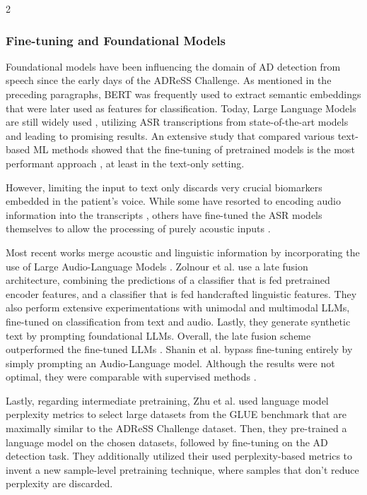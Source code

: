 \documentclass[10pt]{article}
\begin{document}
\begin{multicols}{2}
\subsubsection{Fine-tuning and Foundational Models} \par Foundational models
have been influencing the domain of AD detection from speech since the early
days of the ADReSS Challenge. As mentioned in the preceding paragraphs, BERT
was frequently used to extract semantic embeddings that were later used as
features for classification. Today, Large Language Models are still widely used
\cite{keOptimizingPauseContext2025,parkReasoningBasedApproachChainofThought,rundeOptimizationNaturalLanguage2024},
utilizing ASR transcriptions from state-of-the-art models and leading to
promising results. An extensive study that compared various text-based ML
methods showed that the fine-tuning of pretrained models is the most performant
approach \cite{ihnainiDetectionAlzheimersDisease2025}, at least in the
text-only setting. \par However, limiting the input to text only discards very
crucial biomarkers embedded in the patient's voice. While some have resorted to
encoding audio information into the transcripts
\cite{keOptimizingPauseContext2025}, others have fine-tuned the ASR models
themselves to allow the processing of purely acoustic inputs
\cite{jiaWhisperBasedMultilingualAlzheimers,
akinrintoyoWhisperDDementiaSpeech2025, liWhisperBasedTransferLearning2024}.
\par Most recent works merge acoustic and linguistic information by
incorporating the use of Large Audio-Language Models
\cite{zolnourLLMCAREEarlyDetection2025, shahinZeroShotCognitiveImpairment2025}.
Zolnour et al. use a late fusion architecture, combining the predictions of a
classifier that is fed pretrained encoder features, and a classifier that is
fed handcrafted linguistic features. They also perform extensive
experimentations with unimodal and multimodal LLMs, fine-tuned on
classification from text and audio. Lastly, they generate synthetic text by
prompting foundational LLMs. Overall, the late fusion scheme outperformed the
fine-tuned LLMs \cite{zolnourLLMCAREEarlyDetection2025}. Shanin et al. bypass
fine-tuning entirely by simply prompting an Audio-Language model. Although the
results were not optimal, they were comparable with supervised methods
\cite{shahinZeroShotCognitiveImpairment2025}. \par Lastly, regarding
intermediate pretraining, Zhu et al.
\cite{zhuDomainawareIntermediatePretraining2022a} used language model
perplexity metrics to select large datasets from the GLUE benchmark that are
maximally similar to the ADReSS Challenge dataset. Then, they pre-trained a
language model on the chosen datasets, followed by fine-tuning on the AD
detection task. They additionally utilized their used perplexity-based metrics
to invent a new sample-level pretraining technique, where samples that don't
reduce perplexity are discarded.


\end{multicols}
\end{document}
